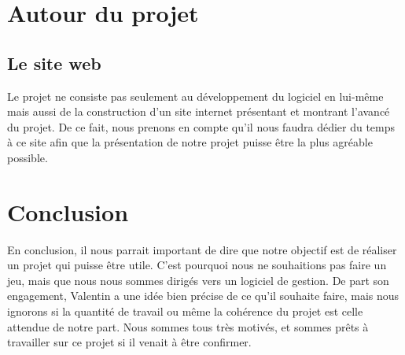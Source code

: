 \section{Autour du projet}

\subsection{Le site web}
Le projet ne consiste pas seulement au développement du logiciel en lui-même mais aussi de la construction d'un site internet présentant et montrant l'avancé du projet. De ce fait, nous prenons en compte qu'il nous faudra dédier du temps à ce site afin que la présentation de notre projet puisse être la plus agréable possible.

\section{Conclusion}
 En conclusion, il nous parrait important de dire que notre objectif est de réaliser un projet qui puisse être utile. C'est pourquoi nous ne souhaitions pas faire un jeu, mais que nous nous sommes dirigés vers un logiciel de gestion. De part son engagement, Valentin a une idée bien précise de ce qu'il souhaite faire, mais nous ignorons si la quantité de travail ou même la cohérence du projet est celle attendue de notre part. Nous sommes tous très motivés, et sommes prêts à travailler sur ce projet si il venait à être confirmer.
